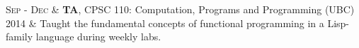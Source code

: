 \documentclass[10pt]{article}
\newcommand{\spacing}{\vspace{0.5cm}}
\begin{document}
\begin{longtable}
    \textsc{Sep - Dec}      & \textbf{TA}, CPSC 110: Computation, Programs and Programming     (UBC)                                                                                                   \\
    \vspace{0.3cm}2014      & {\small Taught the fundamental concepts of functional programming in a Lisp-family language during weekly labs.}
\end{longtable}

\spacing

%
\end{document}

